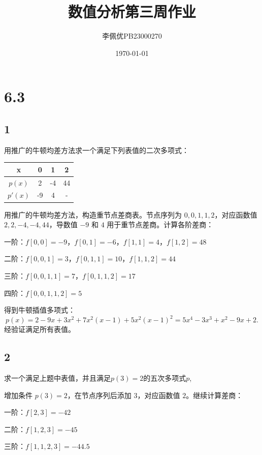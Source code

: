 \documentclass{article}
\title{数值分析第三周作业}
\date{\today}
\author{李佩优PB23000270}
\begin{document}
\maketitle
\section*{6.3}

\subsection*{1}
用推广的牛顿均差方法求一个满足下列表值的二次多项式：

\begin{table}[h!]
  \begin{center}
    \begin{tabular}{c|c|c|c} %
      x & 0 & 1 & 2\\
      \hline
        $p(x)$ & 2 & -4 & 44 \\
        $p'(x)$ & -9 & 4 & - \\
    \end{tabular}
  \end{center}
\end{table}

用推广的牛顿均差方法，构造重节点差商表。节点序列为 \(0,0,1,1,2\)，对应函数值 \(2,2,-4,-4,44\)，导数值 \(-9\) 和 \(4\) 用于重节点差商。计算各阶差商：

一阶：\(f[0,0]=-9\)，\(f[0,1]=-6\)，\(f[1,1]=4\)，\(f[1,2]=48\)

二阶：\(f[0,0,1]=3\)，\(f[0,1,1]=10\)，\(f[1,1,2]=44\)

三阶：\(f[0,0,1,1]=7\)，\(f[0,1,1,2]=17\)

四阶：\(f[0,0,1,1,2]=5\)

得到牛顿插值多项式：
\[
p(x)=2-9x+3x^2+7x^2(x-1)+5x^2(x-1)^2=5x^4-3x^3+x^2-9x+2.
\]
经验证满足所有表值。

\subsection*{2}
求一个满足上题中表值，并且满足$p(3)=2$的五次多项式$p$,

增加条件 \(p(3)=2\)，在节点序列后添加 \(3\)，对应函数值 \(2\)。继续计算差商： 

一阶：\(f[2,3]=-42\)

二阶：\(f[1,2,3]=-45\)

三阶：\(f[1,1,2,3]=-44.5\)
\end{document}

